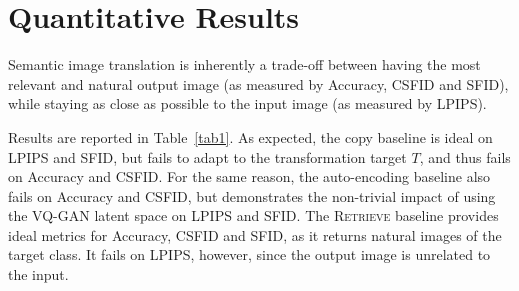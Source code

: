 \section{Quantitative Results}

Semantic image translation is inherently a trade-off between having the most relevant 
and natural output image (as measured by Accuracy, \ac{CSFID} and \ac{SFID}), while staying as 
close as possible to the input image (as measured by \ac{LPIPS}). 

Results are reported in Table~\ref{tab1}. 
As expected, the copy baseline is ideal on \ac{LPIPS} and \ac{SFID}, but fails to adapt to the 
transformation target $T$, and thus fails on Accuracy and \ac{CSFID}.
For the same reason, the auto-encoding baseline also fails on Accuracy and \ac{CSFID}, but 
demonstrates the non-trivial impact of using the VQ-GAN latent space on \ac{LPIPS} and \ac{SFID}. 
The \textsc{Retrieve} baseline provides ideal metrics for Accuracy, \ac{CSFID} and \ac{SFID}, as 
it returns natural images of the target class. 
It fails  on \ac{LPIPS}, however, since the output image is unrelated to the input. 


\begin{table}[H]
\centering
\small
{}
\caption{Evaluation  of \ours and baselines on ImageNet images. %
}
\label{tab1}
\end{table}





